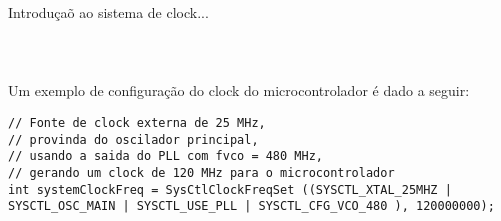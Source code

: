 Introduçaõ ao sistema de clock...\\\\\\\\



Um exemplo de configuração do clock do microcontrolador é dado a seguir:

\begin{lstlisting}[style=citacao]
// Fonte de clock externa de 25 MHz,
// provinda do oscilador principal,
// usando a saida do PLL com fvco = 480 MHz,
// gerando um clock de 120 MHz para o microcontrolador
int systemClockFreq = SysCtlClockFreqSet ((SYSCTL_XTAL_25MHZ | SYSCTL_OSC_MAIN | SYSCTL_USE_PLL | SYSCTL_CFG_VCO_480 ), 120000000);
\end{lstlisting}



